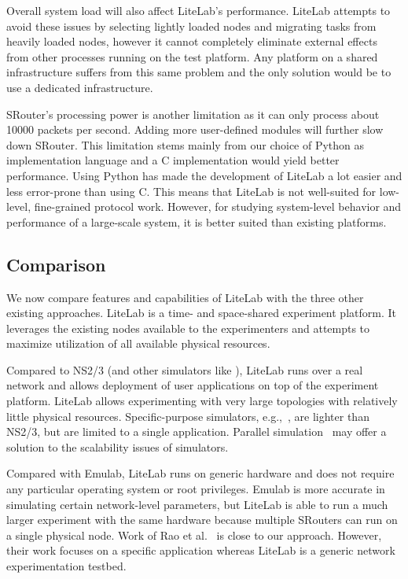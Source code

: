\documentclass[conference]{IEEEtran}
\begin{document}
Overall system load will also affect LiteLab's performance. LiteLab
attempts to avoid these issues by selecting lightly loaded nodes and
migrating tasks from heavily loaded nodes, however it cannot
completely eliminate external effects from other processes running on
the test platform. Any platform on a shared infrastructure suffers
from this same problem and the only solution would be to use a
dedicated infrastructure.



SRouter's processing power is another limitation as it can only
process about 10000 packets per second. Adding more user-defined
modules will further slow down SRouter. This limitation stems mainly
from our choice of Python as implementation language and a C
implementation would yield better performance. Using Python has made
the development of LiteLab a lot easier and less error-prone than
using C. This means that LiteLab is not well-suited for low-level,
fine-grained protocol work. However, for studying system-level
behavior and performance of a large-scale system, it is better suited
than existing platforms.








\subsection{Comparison}
\label{sec:comparison}




We now compare features and capabilities of LiteLab with the three
other existing approaches. LiteLab is a time- and space-shared
experiment platform. It leverages the existing nodes available to the
experimenters and attempts to maximize utilization of all available
physical resources.

Compared to NS2/3 (and other simulators like
\cite{disa2:omnet,ccnsim,ndnsim}), LiteLab runs over a real network
and allows deployment of user applications on top of the experiment
platform. LiteLab allows experimenting with very large topologies with
relatively little physical resources. Specific-purpose simulators,
e.g.,~\cite{PeerSim, CPE:CPE710, 4301435, YangW:GPS}, are lighter than
NS2/3, but are limited to a single application. Parallel
simulation~\cite{Fujimoto:1989:PDE:76738.76741} may offer a solution
to the scalability issues of simulators.






Compared with Emulab, LiteLab runs on generic hardware and does not
require any particular operating system or root privileges. Emulab is
more accurate in simulating certain network-level parameters, but
LiteLab is able to run a much larger experiment with the same hardware
because multiple SRouters can run on a single physical node.  Work of
Rao et al.~\cite{5569970} is close to our approach. However, their
work focuses on a specific application whereas LiteLab is a generic
network experimentation testbed.
\end{document}
